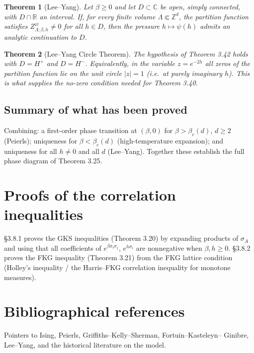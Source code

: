 \documentclass[11pt]{article}
\theoremstyle{plain}
\newtheorem{theorem}{Theorem}
\theoremstyle{definition}
\theoremstyle{remark}
\newcommand{\Z}{\mathbb{Z}}
\newcommand{\R}{\mathbb{R}}
\newcommand{\C}{\mathbb{C}}
\newcommand{\fin}{\Subset}          %
\newcommand{\La}{\Lambda}
\newcommand{\sg}{\sigma}
\begin{document}
\setcounter{theorem}{41}%
\begin{theorem}[Lee--Yang]
Let $\beta\ge0$ and let $D\subset\C$ be open, simply connected, with $D\cap\R$
an interval. If, for every finite volume $\La\fin\Z^d$, the partition function
satisfies $Z^{\varnothing}_{\La;\beta,h}\neq0$ for all $h\in D$, then the
pressure $h\mapsto\psi(h)$ admits an analytic continuation to $D$.
\end{theorem}

\begin{theorem}[Lee--Yang Circle Theorem]
The hypothesis of Theorem 3.42 holds with $D=H^+$ and $D=H^-$. Equivalently, in
the variable $z=e^{-2h}$ all zeros of the partition function lie on the unit
circle $|z|=1$ (i.e.\ at purely imaginary $h$). This is what supplies the
no-zero condition needed for Theorem 3.40.
\end{theorem}

\subsection{Summary of what has been proved}
Combining: a first-order phase transition at $(\beta,0)$ for $\beta>\beta_c(d)$,
$d\ge2$ (Peierls); uniqueness for $\beta<\beta_c(d)$ (high-temperature
expansion); and uniqueness for all $h\neq0$ and all $d$ (Lee--Yang). Together
these establish the full phase diagram of Theorem 3.25.

\section{Proofs of the correlation inequalities}
\S3.8.1 proves the GKS inequalities (Theorem 3.20) by expanding products of
$\sg_A$ and using that all coefficients of $e^{\beta\sg_i\sg_j}$,
$e^{h\sg_i}$ are nonnegative when $\beta,h\ge0$. \S3.8.2 proves the FKG
inequality (Theorem 3.21) from the FKG lattice condition (Holley's inequality /
the Harris--FKG correlation inequality for monotone measures).

\section{Bibliographical references}
Pointers to Ising, Peierls, Griffiths--Kelly--Sherman, Fortuin--Kasteleyn--
Ginibre, Lee--Yang, and the historical literature on the model.
\end{document}
